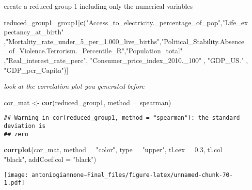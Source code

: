 \documentclass[
]{article}
\newenvironment{Shaded}{\begin{snugshade}}{\end{snugshade}}
\newcommand{\AttributeTok}[1]{\textcolor[rgb]{0.13,0.29,0.53}{#1}}
\newcommand{\FloatTok}[1]{\textcolor[rgb]{0.00,0.00,0.81}{#1}}
\newcommand{\FunctionTok}[1]{\textcolor[rgb]{0.13,0.29,0.53}{\textbf{#1}}}
\newcommand{\NormalTok}[1]{#1}
\newcommand{\OtherTok}[1]{\textcolor[rgb]{0.56,0.35,0.01}{#1}}
\newcommand{\SpecialCharTok}[1]{\textcolor[rgb]{0.81,0.36,0.00}{\textbf{#1}}}
\newcommand{\StringTok}[1]{\textcolor[rgb]{0.31,0.60,0.02}{#1}}
\begin{document}
create a reduced group 1 including only the numerical variables

\begin{Shaded}
\begin{Highlighting}[]
\NormalTok{reduced\_group1}\OtherTok{=}\NormalTok{group1[}\FunctionTok{c}\NormalTok{(}\StringTok{"Access\_to\_electricity.\_percentage\_of\_pop"}\NormalTok{,}\StringTok{"Life\_expectancy\_at\_birth"}\NormalTok{  ,}\StringTok{"Mortality\_rate\_under\_5\_per\_1.000\_live\_births"}\NormalTok{,}\StringTok{"Political\_Stability.Absence\_of\_Violence.Terrorism.\_Percentile\_R"}\NormalTok{,}\StringTok{"Population\_total"}\NormalTok{ ,}\StringTok{"Real\_interest\_rate\_perc"}\NormalTok{, }\StringTok{"Consumer\_price\_index\_2010.\_100"}\NormalTok{ , }\StringTok{"GDP\_US."}\NormalTok{ , }\StringTok{"GDP\_per\_Capita"}\NormalTok{)]}
\end{Highlighting}
\end{Shaded}

\emph{look at the correlation plot you generated before}

\begin{Shaded}
\begin{Highlighting}[]
\NormalTok{cor\_mat }\OtherTok{\textless{}{-}} \FunctionTok{cor}\NormalTok{(reduced\_group1, }\AttributeTok{method =} \StringTok{\textquotesingle{}spearman\textquotesingle{}}\NormalTok{)}
\end{Highlighting}
\end{Shaded}

\begin{verbatim}
## Warning in cor(reduced_group1, method = "spearman"): the standard deviation is
## zero
\end{verbatim}

\begin{Shaded}
\begin{Highlighting}[]
\FunctionTok{corrplot}\NormalTok{(cor\_mat, }\AttributeTok{method =} \StringTok{"color"}\NormalTok{, }\AttributeTok{type =} \StringTok{"upper"}\NormalTok{, }\AttributeTok{tl.cex =} \FloatTok{0.3}\NormalTok{, }\AttributeTok{tl.col =} \StringTok{"black"}\NormalTok{, }\AttributeTok{addCoef.col =} \StringTok{"black"}\NormalTok{)}
\end{Highlighting}
\end{Shaded}

\texttt{[image: antoniogiannone---Final\_files/figure-latex/unnamed-chunk-70-1.pdf]}

\begin{Shaded}
\end{Shaded}
\end{document}
